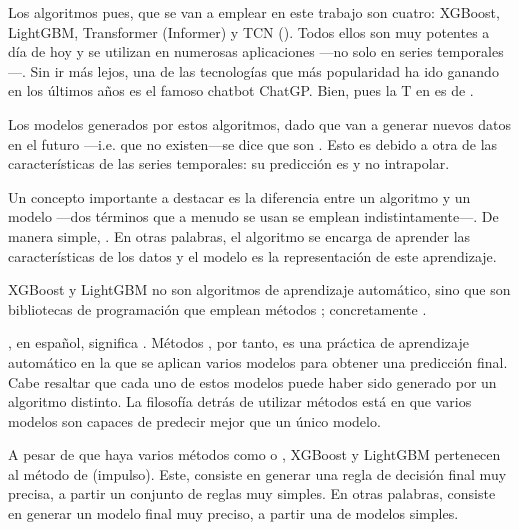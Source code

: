 {

Los algoritmos pues, que se van a emplear en este trabajo son cuatro: XGBoost, LightGBM, Transformer (Informer) y TCN (). Todos ellos son muy potentes a día de hoy y se utilizan en numerosas aplicaciones ---no solo en series temporales---. Sin ir más lejos, una de las tecnologías que más popularidad ha ido ganando en los últimos años es el famoso chatbot ChatGP. Bien, pues la T en  es de .

Los modelos generados por estos algoritmos, dado que van a generar nuevos datos en el futuro ---i.e. que no existen---se dice que son . Esto es debido a otra de las características de las series temporales: su predicción es  y no intrapolar\fnm.

 

Un concepto importante a destacar es la diferencia entre un algoritmo y un modelo ---dos términos que a menudo se usan se emplean indistintamente---. De manera simple, . En otras palabras, el algoritmo se encarga de aprender las características de los datos y el modelo es la representación de este aprendizaje. 

\bigskip


XGBoost y LightGBM no son algoritmos de aprendizaje automático, sino que son bibliotecas de programación que emplean métodos ; concretamente .

, en español, significa . Métodos , por tanto, es una práctica de aprendizaje automático en la que se aplican varios modelos para obtener una predicción final. Cabe resaltar que cada uno de estos modelos puede haber sido generado por un algoritmo distinto. La filosofía detrás de utilizar métodos  está en que varios modelos son capaces de predecir mejor que un único modelo. 

A pesar de que haya varios métodos  como  o , XGBoost y LightGBM pertenecen  al método de  (impulso). Este, consiste en generar una regla de decisión final muy precisa, a partir un conjunto de reglas muy simples. En otras palabras,   consiste en generar un modelo final muy preciso, a partir una  de modelos simples. 

}
